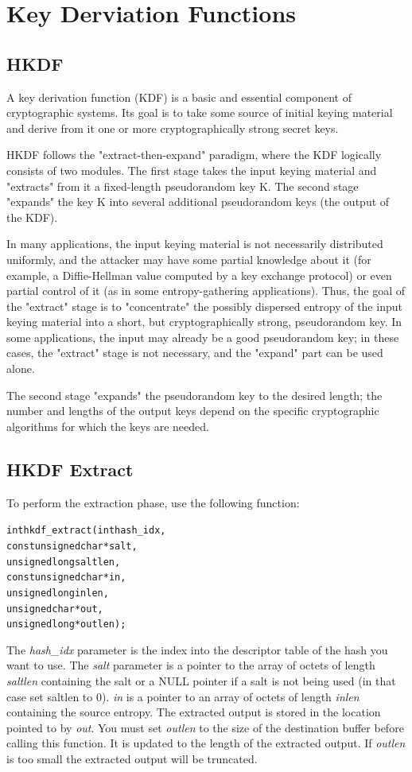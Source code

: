 \documentclass[synpaper]{book}
\newcommand{\mysection}[1]    %
	{                   %
	\section{#1}
   \markboth{\textsf{www.libtom.net}}{\thesection ~ {#1}}
	}
\begin{document}
\mysection{Key Derviation Functions}
\subsection{HKDF}
A key derivation function (KDF) is a basic and essential component of cryptographic systems.  Its goal is to take some source of initial
keying material and derive from it one or more cryptographically strong secret keys.

HKDF follows the "extract-then-expand" paradigm, where the KDF logically consists of two modules.  The first stage takes the input
keying material and "extracts" from it a fixed-length pseudorandom key K.  The second stage "expands" the key K into several additional
pseudorandom keys (the output of the KDF).

In many applications, the input keying material is not necessarily distributed uniformly, and the attacker may have some partial
knowledge about it (for example, a Diffie-Hellman value computed by a key exchange protocol) or even partial control of it (as in some
entropy-gathering applications).  Thus, the goal of the "extract" stage is to "concentrate" the possibly dispersed entropy of the input
keying material into a short, but cryptographically strong, pseudorandom key.  In some applications, the input may already be a
good pseudorandom key; in these cases, the "extract" stage is not necessary, and the "expand" part can be used alone.

The second stage "expands" the pseudorandom key to the desired length; the number and lengths of the output keys depend on the
specific cryptographic algorithms for which the keys are needed.

\subsection{HKDF Extract}
To perform the extraction phase, use the following function:

\begin{alltt}
int hkdf_extract(   int  hash_idx,
    const unsigned char *salt,
          unsigned long  saltlen,
    const unsigned char *in,
          unsigned long  inlen,
          unsigned char *out,
          unsigned long *outlen);
\end{alltt}
The \textit{hash\_idx} parameter is the index into the descriptor table of the hash you want to use.
The \textit{salt} parameter is a pointer to the array of octets of length \textit{saltlen} containing the salt or a NULL pointer if a salt is not being used (in that case set saltlen to 0).
\textit{in} is a pointer to an array of octets of length \textit{inlen} containing the source entropy.  The extracted output is stored in the location pointed to by \textit{out}.
You must set \textit{outlen} to the size of the destination buffer before calling this function. It is updated to the length of the extracted output. If \textit{outlen} is too small the extracted output will be truncated.
\end{document}
